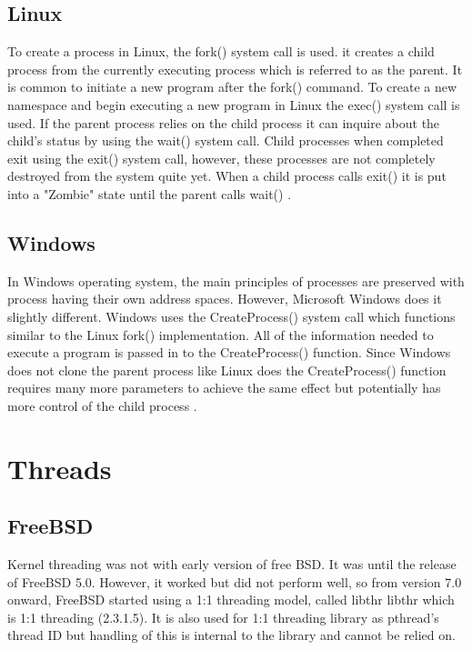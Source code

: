\documentclass[letterpaper,10pt]{article}
\newcommand{\tab}{\hspace*{2em}} %
\begin{document}
\subsection{Linux}
\tab To create a process in Linux, the fork() system call is used. 
it creates a child process from the currently executing process which is
referred to as the parent. It is common to initiate a new program after the fork() command. To create a new
namespace and begin executing a new program in Linux the exec() system call is
used. If the parent process relies on the child process it can inquire about the
child's status by using the wait() system call. Child processes when completed
exit using the exit() system call, however, these processes are not
completely destroyed from the system quite yet. When a child process calls exit()
it is put into a "Zombie" state until the parent calls wait() \cite{Love}.

\subsection{Windows}
\tab In Windows operating system, the main principles of processes are preserved
with process having their own address spaces. However, Microsoft Windows does it slightly
different. Windows uses the CreateProcess() system call which functions similar to 
the Linux fork() implementation. All of the information needed to execute 
a program is passed in to the CreateProcess() function. Since Windows does 
not clone the parent process like Linux does the CreateProcess() function 
requires many more parameters to achieve the same effect but potentially has
more control of the child process \cite{Wini}. 

\section{Threads}
\subsection{FreeBSD}
\tab Kernel threading was not with early version of free BSD. It was until the
release of FreeBSD 5.0. However, it worked but did not perform well, so from
version 7.0 onward, FreeBSD started using a 1:1 threading model, called libthr
libthr which is 1:1 threading \cite{freebsd.org}(2.3.1.5). It is also used for
1:1 threading library as pthread's thread ID but handling of this is internal to
the library and cannot be relied on.




\end{document}
